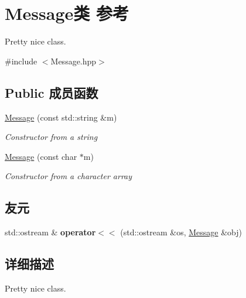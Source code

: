 \hypertarget{classMessage}{}\section{Message类 参考}
\label{classMessage}


Pretty nice class.  




{\ttfamily \#include $<$Message.\+hpp$>$}

\subsection*{Public 成员函数}
\begin{DoxyCompactItemize}
\item 
\hyperlink{classMessage_a2246f9e3015883a76b7a0249c80604ec}{Message} (const std\+::string \&m)
\begin{DoxyCompactList}\small\item\em Constructor from a string \end{DoxyCompactList}\item 
\hyperlink{classMessage_ab165b08f675163c9fde8ed2da0c18d3a}{Message} (const char $\ast$m)
\begin{DoxyCompactList}\small\item\em Constructor from a character array \end{DoxyCompactList}\end{DoxyCompactItemize}
\subsection*{友元}
\begin{DoxyCompactItemize}
\item 
\mbox{\label{classMessage_a6cac7113816180f023230f8dfd14633a}} 
std\+::ostream \& {\bfseries operator$<$$<$} (std\+::ostream \&os, \hyperlink{classMessage}{Message} \&obj)
\end{DoxyCompactItemize}


\subsection{详细描述}
Pretty nice class. 

